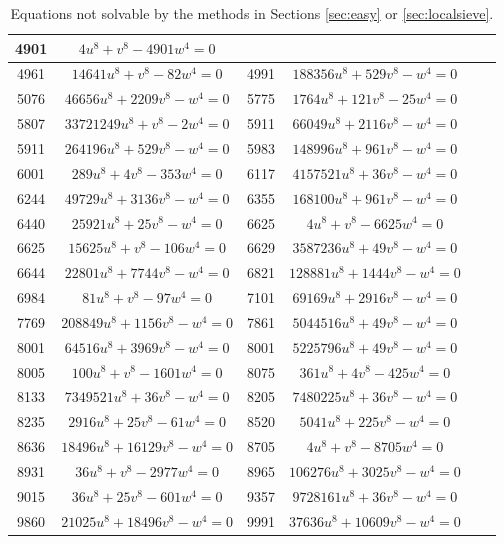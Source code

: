\documentclass[a4paper,12pt,english,reqno]{amsart}
\begin{document}
\begin{table}
\begin{center}
\begin{tabular}{|c|c||c|c|c|c|}
 4901 & $4u^8+v^8-4901 w^4=0$ \\\hline
 4961 & $14641u^8+v^8-82 w^4=0$   &
 4991 & $188356 u^8 + 529 v^8 -  w^4=0$  \\\hline
 5076 & $46656 u^8 + 2209 v^8 -  w^4=0$ &
 5775& $1764 u^8 + 121 v^8 - 25  w^4=0$  \\\hline
 5807& $33721249 u^8+v^8 -2  w^4=0 $ &
 5911 & $66049 u^8 + 2116 v^8 -  w^4=0$ \\\hline
 5911 & $264196 u^8 + 529 v^8 -  w^4=0$ &
 5983 & $148996 u^8 + 961 v^8 -  w^4=0$  \\\hline
 6001 & $289 u^8+4 v^8-353  w^4=0$ &
6117& $4157521 u^8+36 v^8- w^4=0$ \\\hline
6244 & $49729 u^8 + 3136 v^8 -  w^4=0$ &
 6355 & $168100 u^8 + 961 v^8 -  w^4=0$ \\\hline
 6440 & $25921 u^8 + 25 v^8 -  w^4=0$ &
 6625 & $4 u^8 + v^8 - 6625  w^4=0$ \\\hline
 6625 & $15625 u^8 + v^8 - 106  w^4=0$ &
 6629 & $3587236 u^8+49 v^8 - w^4=0 $ \\\hline
 6644 & $22801 u^8 + 7744 v^8 -  w^4=0$ &
 6821 & $128881 u^8+ 1444 v^8- w^4=0 $ \\\hline
 6984 & $81 u^8 + v^8 - 97  w^4=0$ &
 7101 & $69169 u^8 + 2916 v^8 -  w^4=0$ \\\hline
 7769 & $208849 u^8 + 1156 v^8 -  w^4=0$  &
 7861 & $5044516 u^8+49 v^8- w^4=0$ \\\hline
 8001 & $64516 u^8 + 3969 v^8 -  w^4=0$  &
 8001 & $5225796 u^8 + 49 v^8 -  w^4=0$ \\\hline
 8005 & $100 u^8 + v^8 - 1601  w^4=0$  &
8075 & $361 u^8 + 4 v^8 - 425  w^4=0$ \\\hline
 8133 & $7349521 u^8 + 36 v^8 -  w^4=0$  &
 8205 & $7480225 u^8 + 36 v^8 -  w^4=0$ \\\hline
 8235 & $2916u^8+25v^8-61 w^4=0$ &
 8520 & $5041 u^8 + 225 v^8 -  w^4=0$   \\\hline
8636 & $18496 u^8 + 16129 v^8 -  w^4=0$ &
 8705 & $4u^8+v^8-8705 w^4=0$ \\\hline
 8931 & $36u^8+v^8-2977 w^4=0$  &
 8965 & $106276 u^8 + 3025 v^8 -  w^4=0$ \\\hline
 9015 & $36u^8+25v^8-601 w^4=0$  & 
 9357 & $9728161 u^8+36 v^8 - w^4=0$  \\\hline
 
  9860 & $21025 u^8 + 18496 v^8 -  w^4=0$ &
 9991 & $37636u^8+10609v^8- w^4=0$ \\\hline
\end{tabular}
\caption{Equations not solvable by the methods in Sections \ref{sec:easy} or \ref{sec:localsieve}. \label{tb:outputted}}
\end{center}
\end{table}
\end{document}
